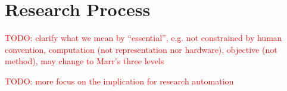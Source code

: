 \documentclass{book}
\begin{document}
\section{Research Process}

\textcolor{red}{TODO: clarify what we mean by ``essential'', e.g. not constrained by human convention, computation (not representation nor hardware), objective (not method), may change to Marr's three levels}

\textcolor{red}{TODO: more focus on the implication for research automation}






\end{document}

